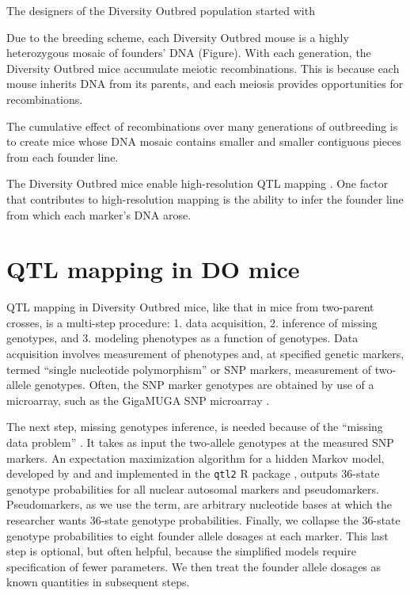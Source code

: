 \documentclass[oneside]{book}\usepackage[]{graphicx}\usepackage[]{color}
\begin{document}
The designers of the Diversity Outbred population started with 

Due to the breeding scheme, each Diversity Outbred mouse is a highly heterozygous mosaic of 
founders' DNA (Figure). 
With each generation, the Diversity Outbred mice accumulate meiotic recombinations. 
This is because each mouse inherits DNA from its parents, and each meiosis provides opportunities for recombinations. 

The cumulative effect of recombinations over many generations of outbreeding is to create mice whose DNA mosaic contains smaller and smaller contiguous pieces from each founder line. 

The Diversity Outbred mice enable high-resolution QTL mapping \citep{gatti2014quantitative}. One factor that contributes to high-resolution mapping is the ability to infer the founder line from which each marker's DNA arose. 




\section{QTL mapping in DO mice}

QTL mapping in Diversity Outbred mice, like that in mice from two-parent crosses, is a multi-step procedure: 1. data acquisition, 2. inference of missing genotypes, and 3. modeling phenotypes as a function of genotypes. Data acquisition involves measurement of phenotypes and, at specified genetic markers, termed ``single nucleotide polymorphism'' or SNP markers, measurement of two-allele genotypes. Often, the SNP marker genotypes are obtained by use of a microarray, such as the GigaMUGA SNP microarray \citep{morgan2015mouse}. 

The next step, missing genotypes inference, is needed because of the ``missing data problem'' \citep{broman2009guide}. It takes as input the two-allele genotypes at the measured SNP markers. An expectation maximization algorithm \citep{dempster1977maximum} for a hidden Markov model, developed by \citet{broman2012haplotype} and \citet{broman2012genotype} and implemented in the \texttt{qtl2} R package \citep{broman2019rqtl2}, outputs 36-state genotype probabilities for all nuclear autosomal markers and pseudomarkers. Pseudomarkers, as we use the term, are arbitrary nucleotide bases at which the researcher wants 36-state genotype probabilities. Finally, we collapse the 36-state genotype probabilities to eight founder allele dosages at each marker. This last step is optional, but often helpful, because the simplified models require specification of fewer parameters. We then treat the founder allele dosages as known quantities in subsequent steps. 
\end{document}
